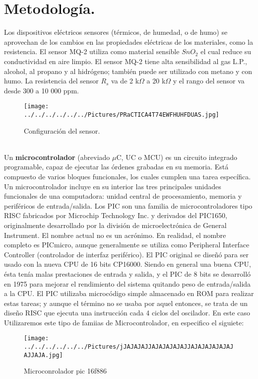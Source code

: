 \documentclass[11pt,a4paper]{article}
\begin{document}
\section{Metodolog\'{i}a.}
Los dispositivos el\'{e}ctricos sensores (t\'{e}rmicos, de humedad, o de humo) se aprovechan de los cambios en las propiedades el\'{e}ctricas de los materiales, como la resistencia. El sensor MQ-2 utiliza como material sensible ${SnO}_{2}$ el cual reduce su conductividad en aire limpio. El sensor MQ-2 tiene alta sensibilidad al gas L.P., alcohol, al propano y al hidr\'{o}geno; tambi\'{e}n puede ser utilizado con metano y con humo. La resistencia del sensor ${R}_{s}$ va de 2 k$\Omega$ a 20 k$\Omega$ y el rango del sensor va desde 300 a 10 000 ppm.
\begin{figure}[hbtp]
\centering
\texttt{[image: ../../../../../../Pictures/PRaCTICA4T74EWFHUHFDUAS.jpg]} 
\caption{Configuraci\'{o}n del sensor.}
\end{figure}
\\
Un \textbf{microcontrolador} (abreviado $\mu$C, UC o MCU) es un circuito integrado programable, capaz de ejecutar las \'{o}rdenes grabadas en su memoria. Est\'{a} compuesto de varios bloques funcionales, los cuales cumplen una tarea espec\'{i}fica. Un microcontrolador incluye en su interior las tres principales unidades funcionales de una computadora: unidad central de procesamiento, memoria y perif\'{e}ricos de entrada/salida. Los PIC son una familia de microcontroladores tipo RISC fabricados por Microchip Technology Inc. y derivados del PIC1650, originalmente desarrollado por la divisi\'{o}n de microelectr\'{o}nica de General Instrument. El nombre actual no es un acr\'{o}nimo. En realidad, el nombre completo es PICmicro, aunque generalmente se utiliza como Peripheral Interface Controller (controlador de interfaz perif\'{e}rico). El PIC original se dise\~{n}\'{o} para ser usado con la nueva CPU de 16 bits CP16000. Siendo en general una buena CPU, \'{e}sta tenía malas prestaciones de entrada y salida, y el PIC de 8 bits se desarroll\'{o} en 1975 para mejorar el rendimiento del sistema quitando peso de entrada/salida a la CPU. El PIC utilizaba microc\'{o}digo simple almacenado en ROM para realizar estas tareas; y aunque el t\'{e}rmino no se usaba por aquel entonces, se trata de un dise\~{n}o RISC que ejecuta una instrucci\'{o}n cada 4 ciclos del oscilador. En este caso Utilizaremos este tipo de famiias de Microcontrolador, en especifico el siguiete: 
\begin{figure}[hbtp]
\centering
\texttt{[image: ../../../../../../Pictures/jJAJAJAJJAJAJAJAJAJJAJAJAJAJAJAJAJJAJA.jpg]}
\caption{Microconrolador pic 16f886}
\end{figure}
\end{document}
